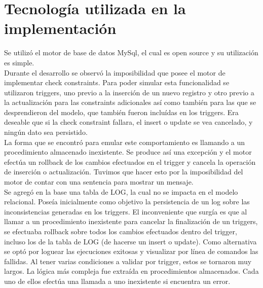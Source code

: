 \documentclass[11pt, a4paper, spanish]{article}
\newenvironment{borde}[1]
{\begin{lrbox}{\fmbox}\begin{minipage}{#1}}
{\end{minipage}\end{lrbox}\fbox{\usebox{\fmbox}}\\[10pt]}
\begin{document}


\newpage 
\section{Tecnolog\'ia utilizada en la implementaci\'on}

    Se utiliz\'o el motor de base de datos MySql, el cual es open source y su utilizaci\'on es simple.\\

    Durante el desarrollo se observ\'o la imposibilidad que posee el motor de implementar check constraints. 
    Para poder simular esta funcionalidad se utilizaron triggers, uno previo a la inserci\'on de un nuevo registro y otro previo a la actualizaci\'on para las constraints adicionales as\'i como tambi\'en para las que se desprendieron del modelo, que tambi\'en fueron inclu\'idas en los triggers.
    Era deseable que si la check constraint fallara, el insert o update se vea cancelado, y ning\'un dato sea persistido.\\

    La forma que se encontr\'o para emular este comportamiento es llamando a un procedimiento almacenado inexistente. 
    Se produce as\'i una excepci\'on y el motor efect\'ua un rollback de los cambios efectuados en el trigger y cancela la operaci\'on de inserci\'on o actualizaci\'on.
    Tuvimos que hacer esto por la imposibilidad del motor de contar con una sentencia para mostrar un mensaje.\\

    Se agreg\'o en la base una tabla de LOG, la cual no se impacta en el modelo relacional. Pose\'ia inicialmente como objetivo la persistencia de un log sobre las inconsistencias generadas en los triggers. El inconveniente que surg\'ia es que al llamar a un procedimiento inexistente para cancelar la finalizaci\'on de un triggers, se efectuaba rollback sobre todos los cambios efectuados dentro del trigger, incluso los de la tabla de LOG (de hacerse un insert o update). Como alternativa se opt\'o por loguear las ejecuciones exitosas y visualizar por l\'inea de comandos las fallidas.
    Al tener varias condiciones a validar por trigger, estos se tornaron muy largos. La l\'ogica m\'as compleja fue extra\'ida en procedimientos almacenados. 
    Cada uno de ellos efect\'ua una llamada a uno inexistente si encuentra un error.\\
\end{document}
